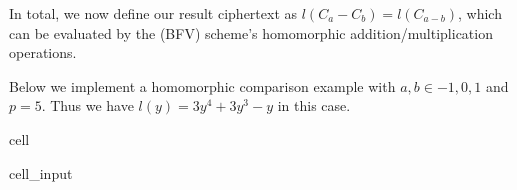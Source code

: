 \documentclass[letterpaper,10pt,english]{jupyterBook}
\begin{document}
\sphinxAtStartPar
In total, we now define our result ciphertext as \(l(C_a - C_b) = l(C_{a-b})\), which can be evaluated by the (BFV) scheme’s homomorphic addition/multiplication operations.

\sphinxAtStartPar
Below we implement a homomorphic comparison example with \(a,b \in {-1,0,1}\) and \(p = 5\).
Thus we have \(l(y) = 3y^4+3y^3-y\) in this case.

\begin{sphinxuseclass}{cell}\begin{sphinxVerbatimInput}

\begin{sphinxuseclass}{cell_input}
\begin{sphinxVerbatim}[commandchars=\\\{\}]
        
     
     

     
       
       
    


\end{sphinxVerbatim}
\end{sphinxuseclass}
\end{sphinxVerbatimInput}
\end{sphinxuseclass}
\end{document}
